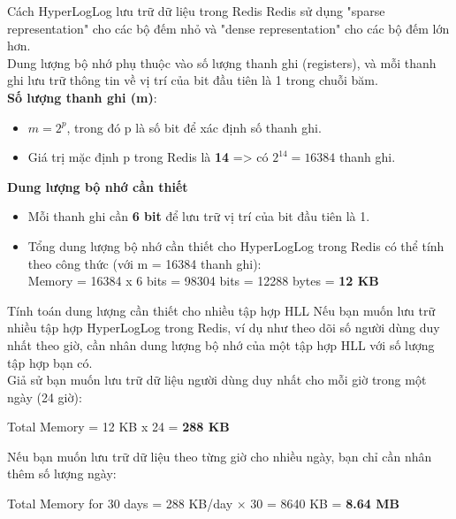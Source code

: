 \documentclass[10pt]{beamer}
\begin{document}
\begin{frame}[fragile]{Cách HyperLogLog lưu trữ dữ liệu trong Redis}
Redis sử dụng "sparse representation" cho các bộ đếm nhỏ và "dense representation" cho các bộ đếm lớn hơn.\\
Dung lượng bộ nhớ phụ thuộc vào số lượng thanh ghi (registers), 
và mỗi thanh ghi lưu trữ thông tin về vị trí của bit đầu tiên là 1 
trong chuỗi băm.\\
\vspace{0.2cm}
\textbf{Số lượng thanh ghi (m)}:
\begin{itemize}
	\item $m = 2^p$, trong đó p là số bit để xác định số thanh ghi.
	\item Giá trị mặc định p trong Redis là \textbf{14} => có $2^{14} = 16384$ thanh ghi.
\end{itemize}
\textbf{Dung lượng bộ nhớ cần thiết}
\begin{itemize}
	\item Mỗi thanh ghi cần \textbf{6 bit} để lưu trữ vị trí của bit đầu tiên là 1.
	\item Tổng dung lượng bộ nhớ cần thiết cho HyperLogLog trong Redis có thể 
  tính theo công thức (với m = 16384 thanh ghi):\\ 
	Memory = 16384 x 6 bits = 98304 bits = 12288 bytes = \textbf{12 KB}
\end{itemize}
\end{frame}

\begin{frame}[fragile]{Tính toán dung lượng cần thiết cho nhiều tập hợp HLL}
Nếu bạn muốn lưu trữ nhiều tập hợp HyperLogLog trong Redis, ví dụ như 
theo dõi số người dùng duy nhất theo giờ, cần nhân dung lượng bộ nhớ 
của một tập hợp HLL với số lượng tập hợp bạn có.\\
Giả sử bạn muốn lưu trữ dữ liệu người dùng duy nhất cho mỗi giờ trong 
một ngày (24 giờ):\\
\begin{center}
  Total Memory = 12 KB x 24 = \textbf{288 KB}
\end{center} 
Nếu bạn muốn lưu trữ dữ liệu theo từng giờ cho nhiều ngày, bạn chỉ cần 
nhân thêm số lượng ngày:
\begin{center}
  Total Memory for 30 days = 288 KB/day × 30 = 8640 KB = \textbf{8.64 MB}
\end{center} 
\end{frame}
\end{document}
